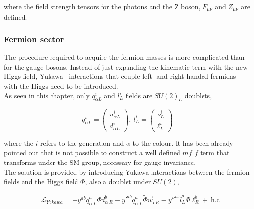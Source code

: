 where the field strength tensors for the photons and the Z boson, $F_{\mu\nu}$ and $Z_{\mu\nu}$ are defined.

\subsubsection{Fermion sector}

The procedure required to acquire the fermion masses is more complicated than for the gauge bosons. Instead of just expanding the kinematic term with the new Higgs field, Yukawa~\cite{yukawa} interactions that couple left- and right-handed fermions with the Higgs need to be introduced.\\

As seen in this chapter, only $q_{\alpha L}^i$ and $l^i_L$ fields are $SU(2)_L$ doublets,

\begin{equation}
    \label{Theory_eq:SUdoublets}
    q_{\alpha L}^i=\begin{pmatrix} u^i_{\alpha L} \\ d^i_{\alpha L} \end{pmatrix},\ l_L^i = \begin{pmatrix} \nu^i_L \\ \ell^i_L \end{pmatrix}
\end{equation}

where the $i$ refers to the generation and $\alpha$ to the colour. It has been already pointed out that is not possible to construct a well defined $mf^\dag f$ term that transforms under the SM group, necessary for gauge invariance.\\

The solution is provided by introducing Yukawa interactions between the fermion fields and the Higgs field $\Phi$, also a doublet under $SU(2)$,

\begin{equation}
\begin{split}
    &\mathcal{L}_{Yukawa} = -y^{ab}\bar{q}^a_{\alpha\ L}\Phi d^b_{\alpha\ R} - y'^{ab}\bar{q}^a_{\alpha\ L}\tilde{\Phi} u^b_{\alpha\ R}-y''^{ab}\bar{l}^a_{L}\Phi \ell^b_{R}+\ \text{h.c}\\
\end{split}
\end{equation}

